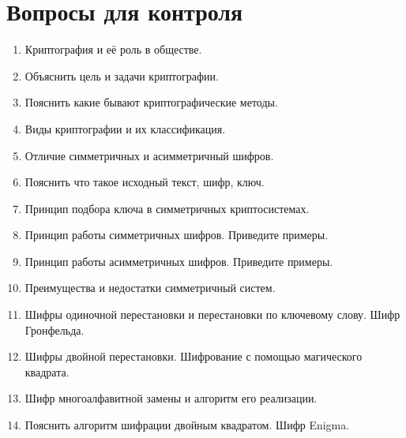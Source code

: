 \section{Вопросы для контроля}\label{sect1_e}
%
\begin{enumerate}
    \item Криптография и её роль в обществе.
    \item Объяснить цель и задачи криптографии.
    \item Пояснить какие бывают криптографические методы.
    \item Виды криптографии и их классификация.
    \item Отличие симметричных и асимметричный шифров.
    \item Пояснить что такое исходный текст, шифр, ключ.
    \item Принцип подбора ключа в симметричных криптосистемах.
    \item Принцип работы симметричных шифров. Приведите примеры.
    \item Принцип работы асимметричных шифров. Приведите примеры.
    \item Преимущества и недостатки симметричный систем.
    \item Шифры одиночной перестановки и перестановки по ключевому слову. Шифр
        Гронфельда.
    \item Шифры двойной перестановки. Шифрование с помощью магического
        квадрата.
    \item Шифр многоалфавитной замены и алгоритм его реализации.
    \item Пояснить алгоритм шифрации двойным квадратом. Шифр Enigma.
\end{enumerate}
